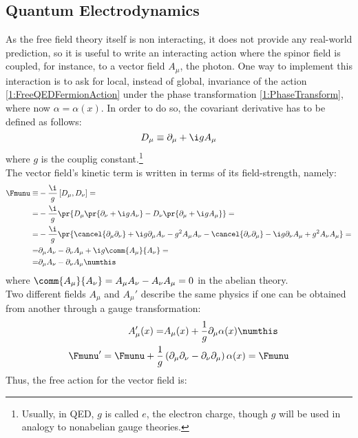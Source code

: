 \subsection{Quantum Electrodynamics\label{Sec:QED}}
As the free field theory itself is non interacting, it does not provide any real-world prediction, so it is useful to write an interacting action where the spinor field is coupled, for instance, to a vector field $A_\mu$, \ie the photon.
One way to implement this interaction is to ask for local, instead of global, invariance of the action \eqref{1:FreeQEDFermionAction} under the phase transformation \eqref{1:PhaseTransform}, where now $\alpha=\alpha(x)$.
In order to do so, the covariant derivative has to be defined as follows:
\begin{equation}
    D_\mu \equiv \partial_\mu+\i g A_\mu \label{1:QEDCovDeriv}
\end{equation}
where $g$ is the couplig constant.\footnote{Usually, in QED, $g$ is called $e$, the electron charge, though $g$ will be used in analogy to nonabelian gauge theories.}\\
The vector field's kinetic term is written in terms of its field-strength, namely:
\begin{align*}
    \Fmunu\equiv& -\frac{\i}{g}\left[D_\mu,D_\nu\right] = \\
    =& -\frac{\i}{g}\pr{D_\mu\pr{\partial_\nu+\i g A_\nu} - D_\nu\pr{\partial_\mu+\i g A_\mu}}=\\
    =& -\frac{\i}{g}\pr{\cancel{\partial_\mu\partial_\nu} + \i g\partial_\mu A_\nu -g^2A_\mu A_\nu - \cancel{\partial_\nu\partial_\mu} - \i g\partial_\nu A_\mu + g^2A_\nu A_\mu}=\\
    =& \partial_\mu A_\nu - \partial_\nu A_\mu + \i g\comm{A_\mu}{A_\nu}=\\
    =& \partial_\mu A_\nu - \partial_\nu A_\mu \numthis\label{1:FieldStrU1}
\end{align*}
where $\comm{A_\mu}{A_\nu}=A_\mu A_\nu-A_\nu A_\mu=0$ in the abelian theory.\\
Two different fields $A_\mu$ and $A_\mu'$ describe the same physics if one can be obtained from another through a gauge transformation:
\begin{align*}
    A_\mu'(x) =& A_\mu(x) + \frac1g \partial_\mu\alpha(x) \numthis\label{1:QEDGaugeTransf} \\
    \Fmunu' = \Fmunu + \frac1g&\left( \partial_\mu\partial_\nu-\partial_\nu\partial_\mu \right)\alpha(x) = \Fmunu
\end{align*}
Thus, the free action for the vector field is:
